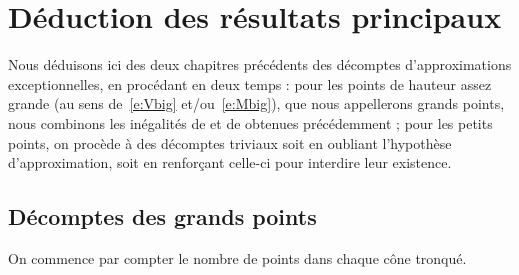 
\chapter{Déduction des résultats principaux}
\label{chap:union}

Nous déduisons ici des deux chapitres précédents des décomptes
d'approximations exceptionnelles, en procédant en deux temps : pour les points
de hauteur assez grande (au sens de~\eqref{e:Vbig} et/ou~\eqref{e:Mbig}), que
nous appellerons grands points, nous combinons les inégalités de 
et de  obtenues précédemment ; pour les petits points, on procède
à des décomptes triviaux soit en oubliant l'hypothèse d'approximation, soit en
renforçant celle-ci pour interdire leur existence.

\section{Décomptes des grands points}
\label{sec:big-points}

On commence par compter le nombre de points dans chaque cône tronqué.

